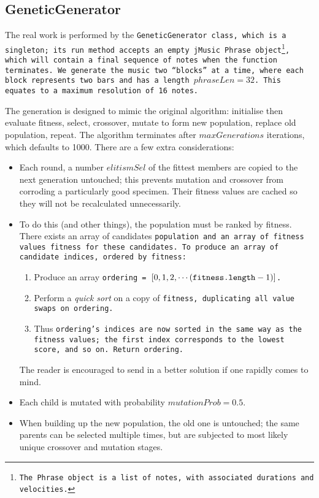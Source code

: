 \subsection{GeneticGenerator}

The real work is performed by the \tt{GeneticGenerator} class, which is a singleton; its \tt{run} method accepts an empty jMusic \tt{Phrase} object\footnote{The \tt{Phrase} object is a list of notes, with associated durations and velocities.}, which will contain a final sequence of notes when the function terminates. We generate the music two ``blocks'' at a time, where each block represents two bars and has a length $phraseLen = 32$. This equates to a maximum resolution of 16\th{} notes.

The generation is designed to mimic the original algorithm: initialise then evaluate fitness, select, crossover, mutate to form new population, replace old population, repeat. The algorithm terminates after $maxGenerations$ iterations, which defaults to 1000. There are a few extra considerations:

\begin{itemize}
	\item Each round, a number $elitismSel$ of the fittest members are copied to the next generation untouched; this prevents mutation and crossover from corroding a particularly good specimen. Their fitness values are cached so they will not be recalculated unnecessarily.
	\item To do this (and other things), the population must be ranked by fitness. There exists an array of candidates \tt{population} and an array of fitness values \tt{fitness} for these candidates. To produce an array of candidate indices, ordered by fitness:
	\begin{enumerate}
		\item Produce an array \tt{ordering} = $[0, 1, 2, \cdots (\tt{fitness.length} - 1)]$.
		\item Perform a \emph{quick sort} on a copy of \tt{fitness}, duplicating all value swaps on \tt{ordering}.
		\item Thus \tt{ordering}'s indices are now sorted in the same way as the fitness values; the first index corresponds to the lowest score, and so on. Return \tt{ordering}.
	\end{enumerate}
	The reader is encouraged to send in a better solution if one rapidly comes to mind.
	\item Each child is mutated with probability $mutationProb = 0.5$.
	\item When building up the new population, the old one is untouched; the same parents can be selected multiple times, but are subjected to most likely unique crossover and mutation stages.
\end{itemize}

